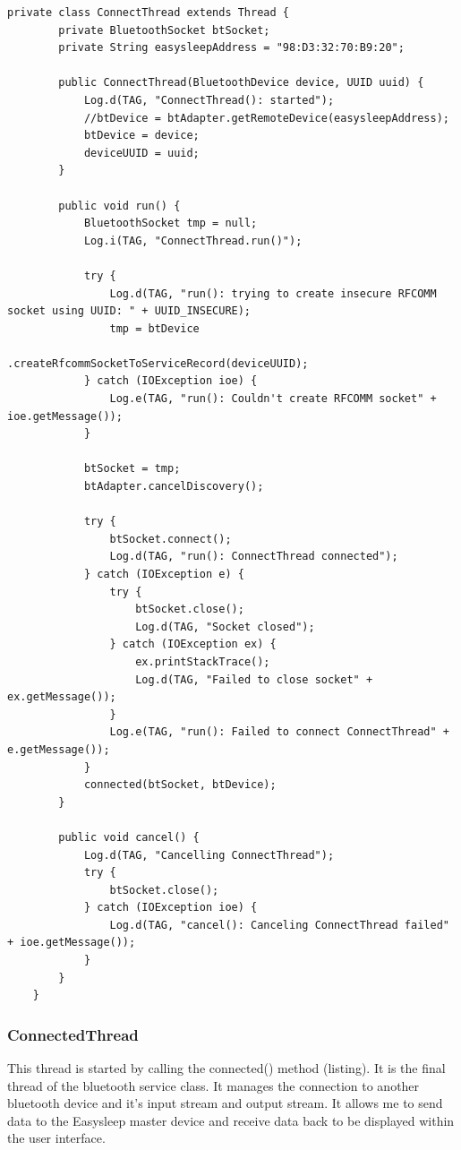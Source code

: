 \documentclass[12pt,a4paper]{article}
\begin{document}
    \begin{lstlisting}[label={lst:connectThread}, caption=ConnectThread class]
     private class ConnectThread extends Thread {
        private BluetoothSocket btSocket;
        private String easysleepAddress = "98:D3:32:70:B9:20";

        public ConnectThread(BluetoothDevice device, UUID uuid) {
            Log.d(TAG, "ConnectThread(): started");
            //btDevice = btAdapter.getRemoteDevice(easysleepAddress);
            btDevice = device;
            deviceUUID = uuid;
        }

        public void run() {
            BluetoothSocket tmp = null;
            Log.i(TAG, "ConnectThread.run()");

            try {
                Log.d(TAG, "run(): trying to create insecure RFCOMM socket using UUID: " + UUID_INSECURE);
                tmp = btDevice
                        .createRfcommSocketToServiceRecord(deviceUUID);
            } catch (IOException ioe) {
                Log.e(TAG, "run(): Couldn't create RFCOMM socket" + ioe.getMessage());
            }

            btSocket = tmp;
            btAdapter.cancelDiscovery();

            try {
                btSocket.connect();
                Log.d(TAG, "run(): ConnectThread connected");
            } catch (IOException e) {
                try {
                    btSocket.close();
                    Log.d(TAG, "Socket closed");
                } catch (IOException ex) {
                    ex.printStackTrace();
                    Log.d(TAG, "Failed to close socket" + ex.getMessage());
                }
                Log.e(TAG, "run(): Failed to connect ConnectThread" + e.getMessage());
            }
            connected(btSocket, btDevice);
        }

        public void cancel() {
            Log.d(TAG, "Cancelling ConnectThread");
            try {
                btSocket.close();
            } catch (IOException ioe) {
                Log.d(TAG, "cancel(): Canceling ConnectThread failed" + ioe.getMessage());
            }
        }
    }
    \end{lstlisting}

    \subsubsection*{ConnectedThread}
    This thread is started by calling the connected() method (listing). It is the final thread of the bluetooth service class. It manages the connection to another bluetooth device and it's input stream and output stream. It allows me to send data to the Easysleep master device and receive data back to be displayed within the user interface.
    
\end{document}
